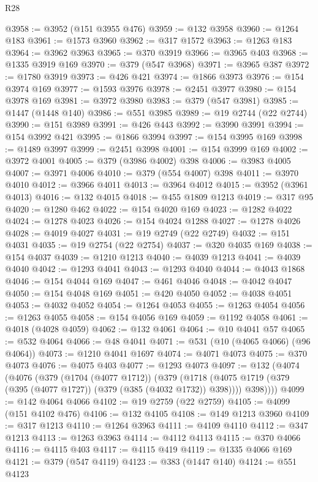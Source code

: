 \begin{lexlean}{R28}
\begin{coremodule}
@3958 := @3952 (@151 @3955 @476)
@3959 := @132 @3958
@3960 := @1264 @183
@3961 := @1573 @3960
@3962 := @317 @1572
@3963 := @1263 @183
@3964 := @3962 @3963
@3965 := @370 @3919
@3966 := @3965 @403
@3968 := @1335 @3919 @169
@3970 := @379 (@547 @3968)
@3971 := @3965 @387
@3972 := @1780 @3919
@3973 := @426 @421
@3974 := @1866 @3973
@3976 := @154 @3974 @169
@3977 := @1593 @3976
@3978 := @2451 @3977
@3980 := @154 @3978 @169
@3981 := @3972 @3980
@3983 := @379 (@547 @3981)
@3985 := @1447 (@1448 @140)
@3986 := @551 @3985
@3989 := @19 @2744 (@22 @2744)
@3990 := @151 @3989
@3991 := @426 @443
@3992 := @3990 @3991
@3994 := @154 @3992 @421
@3995 := @1866 @3994
@3997 := @154 @3995 @169
@3998 := @1489 @3997
@3999 := @2451 @3998
@4001 := @154 @3999 @169
@4002 := @3972 @4001
@4005 := @379 (@3986 @4002) @398
@4006 := @3983 @4005
@4007 := @3971 @4006
@4010 := @379 (@554 @4007) @398
@4011 := @3970 @4010
@4012 := @3966 @4011
@4013 := @3964 @4012
@4015 := @3952 (@3961 @4013)
@4016 := @132 @4015
@4018 := @455 @1809 @1213
@4019 := @317 @95
@4020 := @1280 @462
@4022 := @154 @4020 @169
@4023 := @1282 @4022
@4024 := @1278 @4023
@4026 := @154 @4024 @1288
@4027 := @1278 @4026
@4028 := @4019 @4027
@4031 := @19 @2749 (@22 @2749)
@4032 := @151 @4031
@4035 := @19 @2754 (@22 @2754)
@4037 := @320 @4035 @169
@4038 := @154 @4037
@4039 := @1210 @1213
@4040 := @4039 @1213
@4041 := @4039 @4040
@4042 := @1293 @4041
@4043 := @1293 @4040
@4044 := @4043 @1868
@4046 := @154 @4044 @169
@4047 := @461 @4046
@4048 := @4042 @4047
@4050 := @154 @4048 @169
@4051 := @420 @4050
@4052 := @4038 @4051
@4053 := @4032 @4052
@4054 := @1264 @4053
@4055 := @1263 @4054
@4056 := @1263 @4055
@4058 := @154 @4056 @169
@4059 := @1192 @4058
@4061 := @4018 (@4028 @4059)
@4062 := @132 @4061
@4064 := @10 @4041 @57
@4065 := @532 @4064
@4066 := @48 @4041
@4071 := @531 (@10 (@4065 @4066) (@96 @4064))
@4073 := @1210 @4041 @1697
@4074 := @4071 @4073
@4075 := @370 @4073
@4076 := @4075 @403
@4077 := @1293 @4073
@4097 := @132
    (@4074
      (@4076
        (@379
          (@1704 (@4077 @1712))
          (@379
            (@1718 (@4075 @1719 (@379 (@395 (@4077 @1727)) (@379 (@385 (@4032 @1732)) @398))))
            @398))))
@4099 := @142 @4064 @4066
@4102 := @19 @2759 (@22 @2759)
@4105 := @4099 (@151 @4102 @476)
@4106 := @132 @4105
@4108 := @149 @1213 @3960
@4109 := @317 @1213
@4110 := @1264 @3963
@4111 := @4109 @4110
@4112 := @347 @1213
@4113 := @1263 @3963
@4114 := @4112 @4113
@4115 := @370 @4066
@4116 := @4115 @403
@4117 := @4115 @419
@4119 := @1335 @4066 @169
@4121 := @379 (@547 @4119)
@4123 := @383 (@1447 @140)
@4124 := @551 @4123

\end{coremodule}
\end{lexlean}
